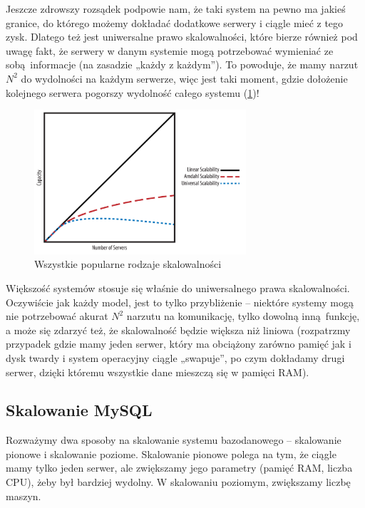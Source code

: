 \documentclass[a4paper,12pt]{article}
\begin{document}
Jeszcze zdrowszy rozsądek podpowie nam, że taki system na pewno ma jakieś granice, do którego możemy dokładać dodatkowe serwery i ciągle mieć z tego zysk. Dlatego też jest uniwersalne prawo skalowalności, które bierze również pod uwagę fakt, że serwery w danym systemie mogą potrzebować wymieniać ze sobą informacje (na zasadzie „każdy z każdym”). To powoduje, że mamy narzut $N^2$ do wydolności na każdym serwerze, więc jest taki moment, gdzie dołożenie kolejnego serwera pogorszy wydolność całego systemu (\ref{fig:scaling-all})!

\begin{figure}[ht]
\centering
\includegraphics[width=0.7\textwidth]{scaling-all.png}
\caption{Wszystkie popularne rodzaje skalowalności}
\label{fig:scaling-all}
\end{figure}


Większość systemów stosuje się właśnie do uniwersalnego prawa skalowalności. Oczywiście jak każdy model, jest to tylko przybliżenie – niektóre systemy mogą nie potrzebować akurat $N^2$ narzutu na komunikację, tylko dowolną inną funkcję, a może się zdarzyć też, że skalowalność będzie większa niż liniowa (rozpatrzmy przypadek gdzie mamy jeden serwer, który ma obciążony zarówno pamięć jak i dysk twardy i system operacyjny ciągle „swapuje”, po czym dokładamy drugi serwer, dzięki któremu wszystkie dane mieszczą się w pamięci RAM).

\subsection{Skalowanie MySQL}

Rozważymy dwa sposoby na skalowanie systemu bazodanowego – skalowanie pionowe i skalowanie poziome. Skalowanie pionowe polega na tym, że ciągle mamy tylko jeden serwer, ale zwiększamy jego parametry (pamięć RAM, liczba CPU), żeby był bardziej wydolny. W skalowaniu poziomym, zwiększamy liczbę maszyn.
\end{document}
